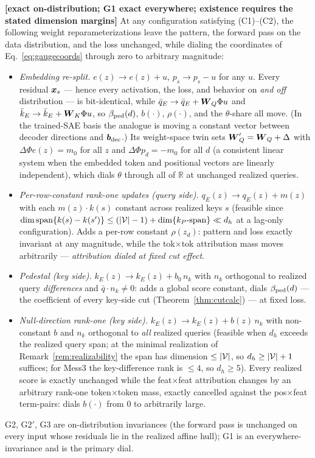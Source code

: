 \documentclass{article}
\begin{document}
\begin{prop}\label{prop:gauge}
\textbf{[exact on-distribution; G1 exact everywhere; existence requires the stated dimension margins]} At any configuration satisfying (C1)--(C2), the following weight reparameterizations leave the pattern, the forward pass on the data distribution, and the loss unchanged, while dialing the coordinates of Eq.~\eqref{eq:gaugecoords} through zero to arbitrary magnitude:
\begin{itemize}
    \item[\textbf{(G1)}] \emph{Embedding re-split.} $e(z) \to e(z) + u$, $p_s \to p_s - u$ for any $u$. Every residual $\boldsymbol{x}_s$ --- hence every activation, the loss, and behavior on \emph{and off} distribution --- is bit-identical, while $\bar q_E \to \bar q_E + \boldsymbol{W}_Q\Phi u$ and $\bar k_E \to \bar k_E + \boldsymbol{W}_K\Phi u$, so $\beta_{\mathrm{ped}}(d)$, $b(\cdot)$, $\rho(\cdot)$, and the $\theta$-share all move. (In the trained-SAE basis the analogue is moving a constant vector between decoder directions and $\boldsymbol{b}_{\mathrm{dec}}$.) Its weight-space twin sets $\boldsymbol{W}_Q' = \boldsymbol{W}_Q + \Delta$ with $\Delta\Phi e(z) = m_0$ for all $z$ and $\Delta\Phi p_d = -m_0$ for all $d$ (a consistent linear system when the embedded token and positional vectors are linearly independent), which dials $\theta$ through all of $\mathbb{R}$ at unchanged realized queries.
    \item[\textbf{(G2)}] \emph{Per-row-constant rank-one updates (query side).} $q_E(z) \to q_E(z) + m(z)$ with each $m(z)\cdot k(s)$ constant across realized keys $s$ (feasible since $\dim\mathrm{span}\{k(s) - k(s')\} \le ({\vert \mathcal{V}\vert} - 1) + \dim\{k_P\text{-span}\} \ll d_h$ at a lag-only configuration). Adds a per-row constant $\rho(z_d)$: pattern and loss exactly invariant at any magnitude, while the tok$\times$tok attribution mass moves arbitrarily --- \emph{attribution dialed at fixed cut effect}.
    \item[\textbf{(G2$'$)}] \emph{Pedestal (key side).} $k_E(z) \to k_E(z) + b_0\, n_k$ with $n_k$ orthogonal to realized query \emph{differences} and $\bar q\cdot n_k \ne 0$: adds a global score constant, dials $\beta_{\mathrm{ped}}(d)$ --- the coefficient of every key-side cut (Theorem~\ref{thm:cutcalc}) --- at fixed loss.
    \item[\textbf{(G3)}] \emph{Null-direction rank-one (key side).} $k_E(z) \to k_E(z) + b(z)\,n_k$ with non-constant $b$ and $n_k$ orthogonal to \emph{all} realized queries (feasible when $d_h$ exceeds the realized query span; at the minimal realization of Remark~\ref{rem:realizability} the span has dimension $\le {\vert \mathcal{V}\vert}$, so $d_h \ge {\vert \mathcal{V}\vert} + 1$ suffices; for Mess3 the key-difference rank is $\le 4$, so $d_h \ge 5$). Every realized score is exactly unchanged while the feat$\times$feat attribution changes by an arbitrary rank-one token$\times$token mass, exactly cancelled against the pos$\times$feat term-pairs: dials $b(\cdot)$ from $0$ to arbitrarily large.
\end{itemize}
G2, G2$'$, G3 are on-distribution invariances (the forward pass is unchanged on every input whose residuals lie in the realized affine hull); G1 is an everywhere-invariance and is the primary dial.


\end{prop}
\end{document}
